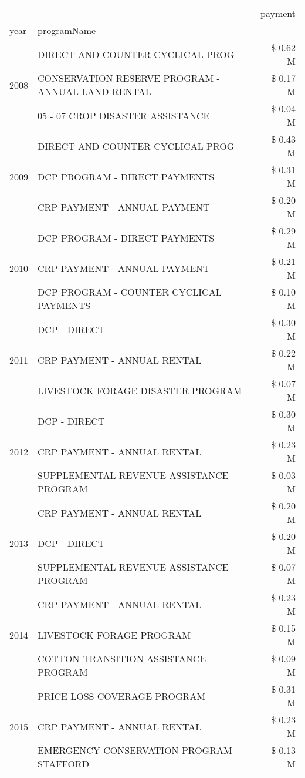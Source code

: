 \begin{tabular}{llr}
\toprule
 &  & payment \\
year & programName &  \\
\midrule
\multirow[t]{3}{*}{2008} & DIRECT AND COUNTER CYCLICAL PROG & \$ 0.62 M \\
 & CONSERVATION RESERVE PROGRAM - ANNUAL LAND RENTAL & \$ 0.17 M \\
 & 05 - 07 CROP DISASTER ASSISTANCE & \$ 0.04 M \\
\cline{1-3}
\multirow[t]{3}{*}{2009} & DIRECT AND COUNTER CYCLICAL PROG & \$ 0.43 M \\
 & DCP PROGRAM - DIRECT PAYMENTS & \$ 0.31 M \\
 & CRP PAYMENT - ANNUAL PAYMENT & \$ 0.20 M \\
\cline{1-3}
\multirow[t]{3}{*}{2010} & DCP PROGRAM - DIRECT PAYMENTS & \$ 0.29 M \\
 & CRP PAYMENT - ANNUAL PAYMENT & \$ 0.21 M \\
 & DCP PROGRAM - COUNTER CYCLICAL PAYMENTS & \$ 0.10 M \\
\cline{1-3}
\multirow[t]{3}{*}{2011} & DCP - DIRECT & \$ 0.30 M \\
 & CRP PAYMENT - ANNUAL RENTAL & \$ 0.22 M \\
 & LIVESTOCK FORAGE DISASTER PROGRAM & \$ 0.07 M \\
\cline{1-3}
\multirow[t]{3}{*}{2012} & DCP - DIRECT & \$ 0.30 M \\
 & CRP PAYMENT - ANNUAL RENTAL & \$ 0.23 M \\
 & SUPPLEMENTAL REVENUE ASSISTANCE PROGRAM & \$ 0.03 M \\
\cline{1-3}
\multirow[t]{3}{*}{2013} & CRP PAYMENT - ANNUAL RENTAL & \$ 0.20 M \\
 & DCP - DIRECT & \$ 0.20 M \\
 & SUPPLEMENTAL REVENUE ASSISTANCE PROGRAM & \$ 0.07 M \\
\cline{1-3}
\multirow[t]{3}{*}{2014} & CRP PAYMENT - ANNUAL RENTAL & \$ 0.23 M \\
 & LIVESTOCK FORAGE PROGRAM & \$ 0.15 M \\
 & COTTON TRANSITION ASSISTANCE PROGRAM & \$ 0.09 M \\
\cline{1-3}
\multirow[t]{3}{*}{2015} & PRICE LOSS COVERAGE PROGRAM & \$ 0.31 M \\
 & CRP PAYMENT - ANNUAL RENTAL & \$ 0.23 M \\
 & EMERGENCY CONSERVATION PROGRAM STAFFORD & \$ 0.13 M \\
\cline{1-3}

\end{tabular}
